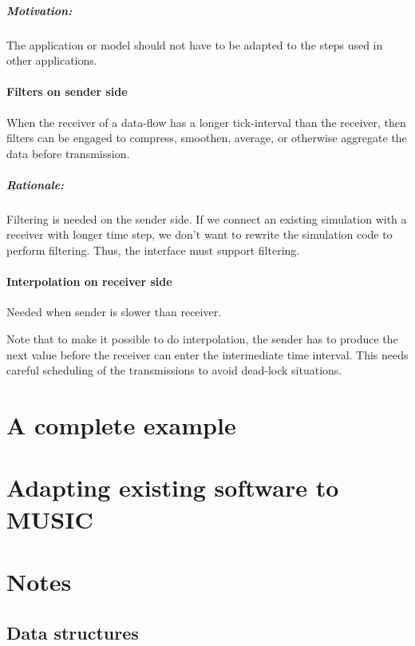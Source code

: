 \documentclass[a4paper]{report}
\newenvironment{rationale}%
{\par\paragraph{Rationale:}}%
{\par}
\begin{document}
\paragraph{Motivation:} The application or model should not have to be
adapted to the steps used in other applications.


\subsubsection{Filters on sender side}

When the receiver of a data-flow has a longer tick-interval than the
receiver, then filters can be engaged to compress, smoothen, average,
or otherwise aggregate the data before transmission.

\begin{rationale}
  Filtering is needed on the sender side.  If we connect an existing
  simulation with a receiver with longer time step, we don't want to
  rewrite the simulation code to perform filtering.  Thus, the
  interface must support filtering.
\end{rationale}


\subsubsection{Interpolation on receiver side}

Needed when sender is slower than receiver.

Note that to make it possible to do interpolation, the sender has to
produce the next value before the receiver can enter the intermediate
time interval.  This needs careful scheduling of the transmissions to
avoid dead-lock situations.

\chapter{A complete example}

\chapter{Adapting existing software to MUSIC}

\chapter{Notes}

\section{Data structures}
\end{document}
